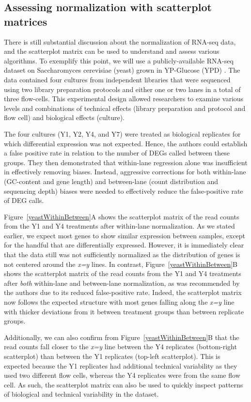 \documentclass{bmcart}
\begin{document}
\begin{linenumbers}
\begin{doublespacing}
\subsection*{Assessing normalization with scatterplot matrices}

There is still substantial discussion about the normalization of RNA-seq data, and the scatterplot matrix can be used to understand and assess various algorithms. To exemplify this point, we will use a publicly-available RNA-seq dataset on Saccharomyces cerevisiae (yeast) grown in YP-Glucose (YPD) \cite{Risso}. The data contained four cultures from independent libraries that were sequenced using two library preparation protocols and either one or two lanes in a total of three flow-cells. This experimental design allowed researchers to examine various levels and combinations of technical effects (library preparation and protocol and flow cell) and biological effects (culture).

The four cultures (Y1, Y2, Y4, and Y7) were treated as biological replicates for which differential expression was not expected. Hence, the authors could establish a false positive rate in relation to the number of DEGs called between these groups. They then demonstrated that within-lane regression alone was insufficient in effectively removing biases. Instead, aggressive corrections for both within-lane (GC-content and gene length) and between-lane (count distribution and sequencing depth) biases were needed to effectively reduce the false-positive rate of DEG calls.

Figure~\ref{yeastWithinBetween}A shows the scatterplot matrix of the read counts from the Y1 and Y4 treatments after within-lane normalization. As we stated earlier, we expect most genes to show similar expression between samples, except for the handful that are differentially expressed. However, it is immediately clear that the data still was not sufficiently normalized as the distribution of genes is not centered around the \textit{x=y} lines. In contrast, Figure~\ref{yeastWithinBetween}B shows the scatterplot matrix of the read counts from the Y1 and Y4 treatments after \textit{both} within-lane and between-lane normalization, as was recommended by the authors due to its reduced false-positive rate. Indeed, the scatterplot matrix now follows the expected structure with most genes falling along the \textit{x=y} line with thicker deviations from it between treatment groups than between replicate groups.

Additionally, we can also confirm from Figure~\ref{yeastWithinBetween}B that the read counts fall closer to the \textit{x=y} line between the Y4 replicates (bottom-right scatterplot) than between the Y1 replicates (top-left scatterplot). This is expected because the Y1 replicates had additional technical variability as they used two different flow cells, whereas the Y4 replicates were from the same flow cell. As such, the scatterplot matrix can also be used to quickly inspect patterns of biological and technical variability in the dataset.


\end{doublespacing}
\end{linenumbers}
\end{document}
